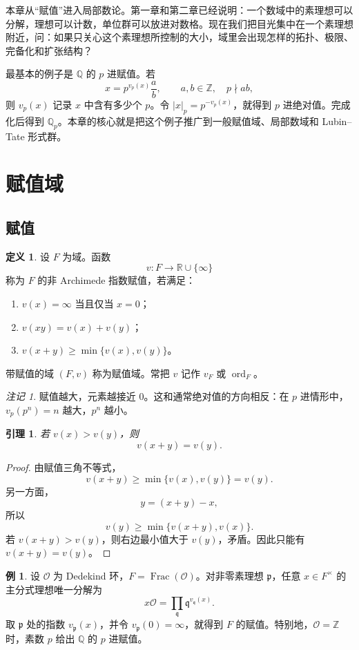 \documentclass[11pt,a4paper,openany]{ctexbook}
\numberwithin{equation}{chapter}
\newcommand{\Q}{\mathbb{Q}}
\newcommand{\R}{\mathbb{R}}
\newcommand{\Z}{\mathbb{Z}}
\theoremstyle{plain}
\newtheorem{lemma}[theorem]{引理}
\theoremstyle{definition}
\newtheorem{definition}[theorem]{定义}
\newtheorem{example}[theorem]{例}
\theoremstyle{remark}
\newtheorem{remark}[theorem]{注记}
\begin{document}
本章从“赋值”进入局部数论。第一章和第二章已经说明：一个数域中的素理想可以分解，理想可以计数，单位群可以放进对数格。现在我们把目光集中在一个素理想附近，问：如果只关心这个素理想所控制的大小，域里会出现怎样的拓扑、极限、完备化和扩张结构？

最基本的例子是 $\Q$ 的 $p$ 进赋值。若
\[
x=p^{v_p(x)}\frac ab,\qquad a,b\in\Z,\quad p\nmid a b,
\]
则 $v_p(x)$ 记录 $x$ 中含有多少个 $p$。令 $|x|_p=p^{-v_p(x)}$，就得到 $p$ 进绝对值。完成化后得到 $\Q_p$。本章的核心就是把这个例子推广到一般赋值域、局部数域和 Lubin--Tate 形式群。

\section{赋值域}

\subsection{赋值}

\begin{definition}
设 $F$ 为域。函数
\[
v:F\longrightarrow \R\cup\{\infty\}
\]
称为 $F$ 的非 Archimede 指数赋值，若满足：
\begin{enumerate}[label=(\arabic*)]
\item $v(x)=\infty$ 当且仅当 $x=0$；
\item $v(xy)=v(x)+v(y)$；
\item $v(x+y)\ge\min\{v(x),v(y)\}$。
\end{enumerate}
带赋值的域 $(F,v)$ 称为赋值域。常把 $v$ 记作 $v_F$ 或 $\operatorname{ord}_F$。
\end{definition}

\begin{remark}
赋值越大，元素越接近 $0$。这和通常绝对值的方向相反：在 $p$ 进情形中，$v_p(p^n)=n$ 越大，$p^n$ 越小。
\end{remark}

\begin{lemma}
若 $v(x)>v(y)$，则
\[
v(x+y)=v(y).
\]
\end{lemma}

\begin{proof}
由赋值三角不等式，
\[
v(x+y)\ge \min\{v(x),v(y)\}=v(y).
\]
另一方面，
\[
y=(x+y)-x,
\]
所以
\[
v(y)\ge \min\{v(x+y),v(x)\}.
\]
若 $v(x+y)>v(y)$，则右边最小值大于 $v(y)$，矛盾。因此只能有 $v(x+y)=v(y)$。
\end{proof}

\begin{example}
设 $\mathcal O$ 为 Dedekind 环，$F=\operatorname{Frac}(\mathcal O)$。对非零素理想 $\mathfrak p$，任意 $x\in F^\times$ 的主分式理想唯一分解为
\[
x\mathcal O=\prod_{\mathfrak q}\mathfrak q^{v_{\mathfrak q}(x)}.
\]
取 $\mathfrak p$ 处的指数 $v_{\mathfrak p}(x)$，并令 $v_{\mathfrak p}(0)=\infty$，就得到 $F$ 的赋值。特别地，$\mathcal O=\Z$ 时，素数 $p$ 给出 $\Q$ 的 $p$ 进赋值。
\end{example}
\end{document}

